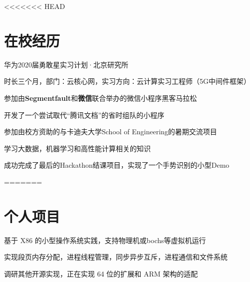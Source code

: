 \documentclass[]{deedy-resume-openfont}
\begin{document}
\begin{minipage}[t]{0.73\textwidth} 

<<<<<<< HEAD

\section{在校经历}
\vspace{\topsep}
\begin{tightemize}
    \item 华为2020届勇敢星实习计划·北京研究所
    \item 时长三个月，部门：云核心网，实习方向：云计算实习工程师（5G中间件框架）
    \end{tightemize}
\sectionsep

\begin{tightemize}
    \item 参加由\textbf{Segmentfault}和\textbf{微信}联合举办的微信小程序黑客马拉松
    \item 开发了一个尝试取代“腾讯文档”的省时组队的小程序
    \end{tightemize}
\sectionsep

\begin{tightemize}
    \item 参加由校方资助的与卡迪夫大学School of Engineering的暑期交流项目
    \item 学习大数据，机器学习和高性能计算相关的知识
    \item 成功完成了最后的Hackathon结课项目，实现了一个手势识别的小型Demo
    \end{tightemize}
\sectionsep

\sectionsep
{}
=======

\section{个人项目}
\sectionsep
{}
\vspace{\topsep}
\begin{tightemize}
    \item 基于 X86 的小型操作系统实践，支持物理机或bochs等虚拟机运行
    \item 实现段页内存分配，进程线程管理，同步异步互斥，进程通信和文件系统
    \item 调研其他开源实现，正在实现 64 位的扩展和 ARM 架构的适配
    \end{tightemize}
\sectionsep


\end{minipage}
\end{document}
